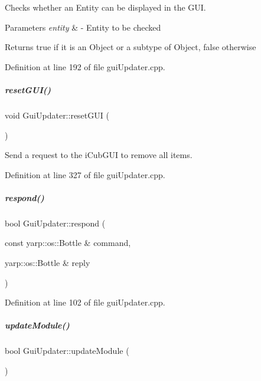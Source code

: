 Checks whether an Entity can be displayed in the G\+UI. 


\begin{DoxyParams}{Parameters}
{\em entity} & -\/ Entity to be checked \\
\hline
\end{DoxyParams}
\begin{DoxyReturn}{Returns}
true if it is an {\ttfamily Object} or a subtype of {\ttfamily Object}, false otherwise 
\end{DoxyReturn}


Definition at line 192 of file gui\+Updater.\+cpp.

\mbox{\label{group__guiUpdater_aae5c54332b87a2981d6e5a1f704b9459}} 
\subparagraph{\texorpdfstring{reset\+G\+U\+I()}{resetGUI()}}
{\footnotesize\ttfamily void Gui\+Updater\+::reset\+G\+UI (\begin{DoxyParamCaption}{ }\end{DoxyParamCaption})}



Send a request to the i\+Cub\+G\+UI to remove all items. 



Definition at line 327 of file gui\+Updater.\+cpp.

\mbox{\label{group__guiUpdater_a65c3df8e11e7439a0c8d01fec93b10c1}} 
\subparagraph{\texorpdfstring{respond()}{respond()}}
{\footnotesize\ttfamily bool Gui\+Updater\+::respond (\begin{DoxyParamCaption}\item[{const yarp\+::os\+::\+Bottle \&}]{command,  }\item[{yarp\+::os\+::\+Bottle \&}]{reply }\end{DoxyParamCaption})}



Definition at line 102 of file gui\+Updater.\+cpp.

\mbox{\label{group__guiUpdater_a344c4d08c3da25c91699b1b41575b5f9}} 
\subparagraph{\texorpdfstring{update\+Module()}{updateModule()}}
{\footnotesize\ttfamily bool Gui\+Updater\+::update\+Module (\begin{DoxyParamCaption}{ }\end{DoxyParamCaption})}




